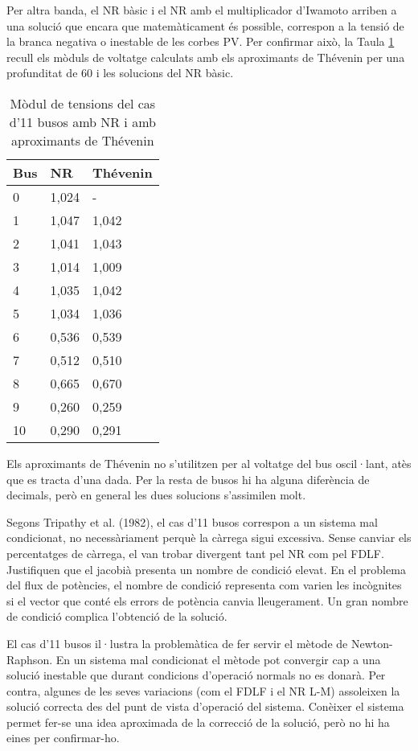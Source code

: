 Per altra banda, el NR bàsic i el NR amb el multiplicador d'Iwamoto arriben a una solució que encara que matemàticament és possible, correspon a la tensió de la branca negativa o inestable de les corbes PV. Per confirmar això, la Taula \ref{tab:modulcas11thx} recull els mòduls de voltatge calculats amb els aproximants de Thévenin per una profunditat de 60 i les solucions del NR bàsic. 

\begin{table}[!htb]
\begin{center}
  \begin{tabular}{lll}
  \hline
  Bus & NR & Thévenin\\
  \hline
  \hline
  0 & 1,024 & -\\
  1 & 1,047 & 1,042\\
  2 & 1,041 & 1,043\\
  3 & 1,014 & 1,009\\
  4 & 1,035 & 1,042\\
  5 & 1,034 & 1,036\\
  6 & 0,536 & 0,539\\
  7 & 0,512 & 0,510\\
  8 & 0,665 & 0,670\\
  9 & 0,260 & 0,259\\
  10 & 0,290 & 0,291\\
  \hline 
  \end{tabular}
  \caption{Mòdul de tensions del cas d'11 busos amb NR i amb aproximants de Thévenin}
  \label{tab:modulcas11thx}
  \end{center}
\end{table}

Els aproximants de Thévenin no s'utilitzen per al voltatge del bus oscil·lant, atès que es tracta d'una dada. Per la resta de busos hi ha alguna diferència de decimals, però en general les dues solucions s'assimilen molt. 

Segons Tripathy et al. (1982), el cas d'11 busos correspon a un sistema mal condicionat, no necessàriament perquè la càrrega sigui excessiva. Sense canviar els percentatges de càrrega, el van trobar divergent tant pel NR com pel FDLF. Justifiquen que el jacobià presenta un nombre de condició elevat. En el problema del flux de potències, el nombre de condició representa com varien les incògnites si el vector que conté els errors de potència canvia lleugerament. Un gran nombre de condició complica l'obtenció de la solució.

El cas d'11 busos il·lustra la problemàtica de fer servir el mètode de Newton-Raphson. En un sistema mal condicionat el mètode pot convergir cap a una solució inestable que durant condicions d'operació normals no es donarà. Per contra, algunes de les seves variacions (com el FDLF i el NR L-M) assoleixen la solució correcta des del punt de vista d'operació del sistema. Conèixer el sistema permet fer-se una idea aproximada de la correcció de la solució, però no hi ha eines per confirmar-ho.

